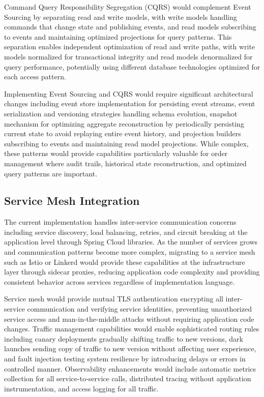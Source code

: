 Command Query Responsibility Segregation (CQRS) would complement Event Sourcing by separating read and write models, with write models handling commands that change state and publishing events, and read models subscribing to events and maintaining optimized projections for query patterns. This separation enables independent optimization of read and write paths, with write models normalized for transactional integrity and read models denormalized for query performance, potentially using different database technologies optimized for each access pattern.

Implementing Event Sourcing and CQRS would require significant architectural changes including event store implementation for persisting event streams, event serialization and versioning strategies handling schema evolution, snapshot mechanism for optimizing aggregate reconstruction by periodically persisting current state to avoid replaying entire event history, and projection builders subscribing to events and maintaining read model projections. While complex, these patterns would provide capabilities particularly valuable for order management where audit trails, historical state reconstruction, and optimized query patterns are important.

\subsection{Service Mesh Integration}

The current implementation handles inter-service communication concerns including service discovery, load balancing, retries, and circuit breaking at the application level through Spring Cloud libraries. As the number of services grows and communication patterns become more complex, migrating to a service mesh such as Istio or Linkerd would provide these capabilities at the infrastructure layer through sidecar proxies, reducing application code complexity and providing consistent behavior across services regardless of implementation language.

Service mesh would provide mutual TLS authentication encrypting all inter-service communication and verifying service identities, preventing unauthorized service access and man-in-the-middle attacks without requiring application code changes. Traffic management capabilities would enable sophisticated routing rules including canary deployments gradually shifting traffic to new versions, dark launches sending copy of traffic to new version without affecting user experience, and fault injection testing system resilience by introducing delays or errors in controlled manner. Observability enhancements would include automatic metrics collection for all service-to-service calls, distributed tracing without application instrumentation, and access logging for all traffic.

